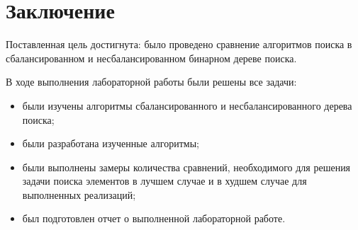 \chapter*{Заключение}

Поставленная цель достигнута: было проведено сравнение алгоритмов поиска в сбалансированном и несбалансированном бинарном дереве поиска.

В ходе выполнения лабораторной работы были решены все задачи:


\begin{itemize}
	\item были изучены алгоритмы сбалансированного и несбалансированного дерева поиска;
	\item были разработана изученные алгоритмы;
	\item были выполнены замеры количества сравнений, необходимого для решения задачи поиска элементов в лучшем случае и в худшем случае для выполненных реализаций;
	\item был подготовлен отчет о выполненной лабораторной работе.
\end{itemize}